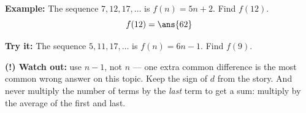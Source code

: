 \documentclass[12pt]{article}
\begin{document}
\begin{examplebox}
\textbf{Example:} The sequence $7, 12, 17, \ldots$ is $f(n) = 5n + 2$. Find
$f(12)$.
\[ f(12) = \ans{62} \]
\end{examplebox}

\begin{tryitbox}
\textbf{Try it:} The sequence $5, 11, 17, \ldots$ is $f(n) = 6n - 1$. Find
$f(9)$.\\[2pt]
\end{tryitbox}

\begin{watchoutbox}
\textbf{(!) Watch out:} use $n-1$, not $n$ --- one extra common difference is the
most common wrong answer on this topic. Keep the sign of $d$ from the story. And
never multiply the number of terms by the \emph{last} term to get a sum: multiply
by the average of the first and last.
\end{watchoutbox}
\end{document}
